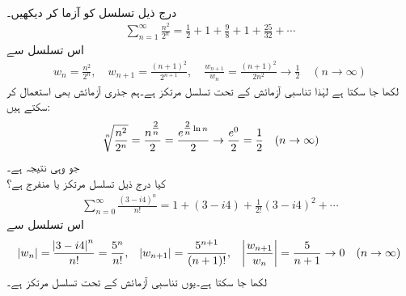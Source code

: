 \quad {}\\
درج ذیل تسلسل کو آزما کر دیکھیں۔
\begin{align*}
\sum_{n=1}^{\infty} \frac{n^2}{2^n}=\frac{1}{2}+1+\frac{9}{8}+1+\frac{25}{32}+\cdots
\end{align*}
اس تسلسل سے 
\begin{align*}
w_n=\frac{n^2}{2^n}, \quad w_{n+1}=\frac{(n+1)^2}{2^{n+1}},\quad \frac{w_{n+1}}{w_n}=\frac{(n+1)^2}{2n^2}\to \frac{1}{2}\quad (n\to\infty)
\end{align*}
لکھا جا سکتا ہے لہٰذا تناسبی آزمائش کے تحت تسلسل مرتکز ہے۔ہم جذری آزمائش بھی استعمال کر سکتے ہیں:
\begin{align*}
\sqrt[\leftroot{-2}n]{\frac{n^2}{2^n}}=\frac{n^{\tfrac{2}{n}}}{2}=\frac{e^{\tfrac{2}{n}\ln n}}{2}\to \frac{e^0}{2}=\frac{1}{2}\quad (n\to\infty)
\end{align*}
جو وہی نتیجہ ہے۔ 
\quad {}\\
کیا درج ذیل تسلسل مرتکز یا منفرج ہے؟
\begin{align*}
\sum_{n=0}^{\infty}\frac{(3-i4)^n}{n!}=1+(3-i4)+\frac{1}{2!}(3-i4)^2+\cdots
\end{align*}
اس تسلسل سے 
\begin{align*}
\abs{w_n}=\frac{\abs{3-i4}^n}{n!}=\frac{5^n}{n!}, \quad \abs{w_{n+1}}=\frac{5^{n+1}}{(n+1)!},\quad \abs{\frac{w_{n+1}}{w_n}}=\frac{5}{n+1}\to 0 \quad (n\to \infty)
\end{align*}
لکھا جا سکتا ہے۔یوں تناسبی آزمائش کے تحت تسلسل مرتکز ہے۔

